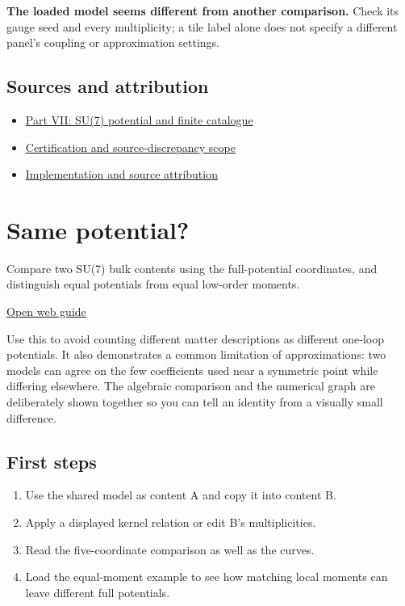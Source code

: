 \documentclass[11pt,a4paper]{article}
\begin{document}
\textbf{The loaded model seems different from another comparison.} Check its gauge seed and every multiplicity; a tile label alone does not specify a different panel's coupling or approximation settings.

\subsection*{Sources and attribution}
\begin{itemize}
\item \href{https://karlesmarin.github.io/ghu-explorer/papers/part-vii/index.html}{Part VII: SU(7) potential and finite catalogue}
\item \href{https://karlesmarin.github.io/ghu-explorer/docs/su7-certification.html}{Certification and source-discrepancy scope}
\item \href{https://github.com/karlesmarin/ghu-lab/blob/main/src/sections/atlas_section.js}{Implementation and source attribution}
\end{itemize}
\section{Same potential?}
Compare two SU(7) bulk contents using the full-potential coordinates, and distinguish equal potentials from equal low-order moments.

\href{https://karlesmarin.github.io/ghu-explorer/guide/samepot/index.html}{Open web guide}

Use this to avoid counting different matter descriptions as different one-loop potentials. It also demonstrates a common limitation of approximations: two models can agree on the few coefficients used near a symmetric point while differing elsewhere. The algebraic comparison and the numerical graph are deliberately shown together so you can tell an identity from a visually small difference.
\subsection*{First steps}
\begin{enumerate}
\item Use the shared model as content A and copy it into content B.
\item Apply a displayed kernel relation or edit B's multiplicities.
\item Read the five-coordinate comparison as well as the curves.
\item Load the equal-moment example to see how matching local moments can leave different full potentials.
\end{enumerate}
\end{document}

